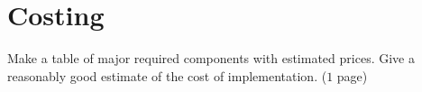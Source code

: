 
\chapter{Costing}
\label{Chapter8}

Make a table of major required components with estimated prices.
Give a reasonably good estimate of the cost of implementation.
($1$ page)